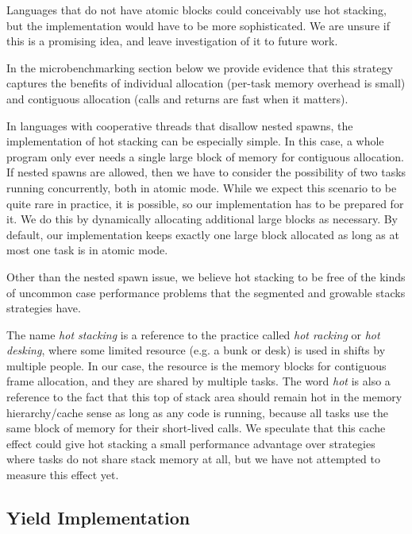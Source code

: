 \documentclass[acmsmall,anonymous,review]{acmart}\settopmatter{printfolios=true,printccs=false,printacmref=false}
\begin{document}
Languages that do not have atomic blocks could conceivably use hot stacking, but the implementation would have to be more sophisticated.
We are unsure if this is a promising idea, and leave investigation of it to future work.

In the microbenchmarking section below we provide evidence that this strategy captures the benefits of individual allocation (per-task memory overhead is small) and contiguous allocation (calls and returns are fast when it matters).

In languages with cooperative threads that disallow nested spawns, the implementation of hot stacking can be especially simple.
In this case, a whole program only ever needs a single large block of memory for contiguous allocation.
If nested spawns are allowed, then we have to consider the possibility of two tasks running concurrently, both in atomic mode.
While we expect this scenario to be quite rare in practice, it is possible, so our implementation has to be prepared for it.
We do this by dynamically allocating additional large blocks as necessary.
By default, our implementation keeps exactly one large block allocated as long as at most one task is in atomic mode.

Other than the nested spawn issue, we believe hot stacking to be free of the kinds of uncommon case performance problems that the segmented and growable stacks strategies have.

The name \emph{hot stacking} is a reference to the practice called \emph{hot racking} or \emph{hot desking}, where some limited resource (e.g. a bunk or desk) is used in shifts by multiple people.
In our case, the resource is the memory blocks for contiguous frame allocation, and they are shared by multiple tasks.
The word \emph{hot} is also a reference to the fact that this top of stack area should remain hot in the memory hierarchy/cache sense as long as any code is running, because all tasks use the same block of memory for their short-lived calls.
We speculate that this cache effect could give hot stacking a small performance advantage over strategies where tasks do not share stack memory at all, but we have not attempted to measure this effect yet.


\subsection{Yield Implementation}
\label{sec:yield_imp}
\end{document}
